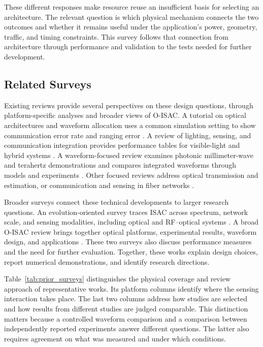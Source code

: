 These different responses make resource reuse an insufficient basis for
selecting an architecture. The relevant question is which physical mechanism
connects the two outcomes and whether it remains useful under the application's
power, geometry, traffic, and timing constraints. This survey follows that
connection from architecture through performance and validation to the tests
needed for further development.

\subsection{Related Surveys}
\label{sec:related_surveys}

Existing reviews provide several perspectives on these design questions,
through platform-specific analyses and broader views of O-ISAC. A tutorial on
optical architectures and waveform allocation
uses a common simulation setting to show communication error rate and ranging
error \cite{Wen2024OISACArchitectures}. A review of lighting, sensing, and
communication integration provides performance tables for visible-light and
hybrid systems \cite{Liang2024LiSACReview}. A waveform-focused review examines
photonic millimeter-wave and terahertz demonstrations and compares integrated
waveforms through models and experiments
\cite{Lyu2026PhotonicTHzWaveforms}. Other focused reviews address optical transmission and
estimation, or communication and sensing in fiber networks
\cite{Su2025OISACTheoryPractice,Khorasgani2026GeneralOpticalISACSurvey,
Liu2026OpticalFiberISACReview,Lu2026ConvergedFiberISACReview}.

Broader surveys connect these technical developments to larger research
questions. An evolution-oriented survey traces ISAC across spectrum, network
scale, and sensing modalities, including optical and RF--optical systems
\cite{Zhang2026ISACEvolution}. A broad O-ISAC review brings together optical
platforms, experimental results, waveform design, and applications
\cite{Mohsan2026OISACReview}. These two surveys also discuss performance
measures and the need for further evaluation.
Together, these works explain design choices, report numerical
demonstrations, and identify research directions.

Table~\ref{tab:prior_surveys} distinguishes the physical coverage and review
approach of representative works. Its platform columns identify where the
sensing interaction takes place. The last two columns address how studies
are selected and how results from different studies are judged comparable.
This distinction matters because a controlled waveform comparison and a
comparison between independently reported experiments answer different
questions. The latter also requires agreement on what was measured and under
which conditions.


